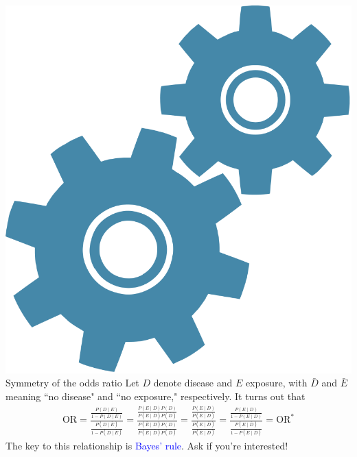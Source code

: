 \documentclass[10pt,t]{beamer}
\begin{document}
\begin{frame}{\includegraphics[scale=0.01]{./figs/technical} Symmetry of the odds ratio}
	Let $D$ denote disease and $E$ exposure, with $\bar{D}$ and $\bar{E}$ meaning ``no disease" and ``no exposure," respectively. It turns out that 
	\begin{align*}
		\text{OR} = \frac{\frac{P(D \mid E)}{1 - P(D \mid  E)}}{\frac{P(D \mid \bar{E})}{1 - P(D \mid \bar{E})}} = \frac{\frac{P(E \mid D)P(D)}{P(E \mid \bar{D})P(\bar{D})}}{\frac{P(\bar{E} \mid D)P(D)}{P(\bar{E} \mid \bar{D})P(\bar{D})}} = \frac{\frac{P(E \mid D)}{P(\bar{E} \mid D)}}{\frac{P(E \mid \bar{D})}{P(\bar{E} \mid \bar{D})}} = \frac{\frac{P(E \mid D)}{1 - P(E \mid D)}}{\frac{P(E\mid \bar{D})}{1 - P(E\mid \bar{D})}} = \text{OR}^*
	\end{align*}
	The key to this relationship is \textcolor{blue}{Bayes' rule}. Ask if you're interested!
\end{frame}
\end{document}
